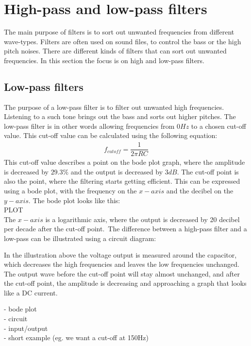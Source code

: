 \chapter{High-pass and low-pass filters}
The main purpose of filters is to sort out unwanted frequencies from different wave-types. Filters are often used on sound files, to control the bass or the high pitch noises. There are different kinds of filters that can sort out unwanted frequencies. In this section the focus is on high and low-pass filters.

\section{Low-pass filters}
The purpose of a low-pass filter is to filter out unwanted high frequencies. Listening to a such tone brings out the bass and sorts out higher pitches. The low-pass filter is in other words allowing frequencies from 0$Hz$ to a chosen cut-off value. This cut-off value can be calculated using the following equation:
\begin{align*}
f_{cutoff}=\dfrac{1}{2 \pi RC}
\end{align*}
This cut-off value describes a point on the bode plot graph, where the amplitude is decreased by $29.3\%$ and the output is decreased by 3$dB$. The cut-off point is also the point, where the filtering starts getting efficient. This can be expressed using a bode plot, with the frequency on the $x-axis$ and the decibel on the $y-axis$. The bode plot looks like this: \\
PLOT \\
The $x-axis$ is a logarithmic axis, where the output is decreased by 20 decibel per decade after the cut-off point.\
The difference between a high-pass filter and a low-pass can be illustrated using a circuit diagram:
\begin{figure}[H]
	
\end{figure}
In the illustration above the voltage output is measured around the capacitor, which decreases the high frequencies and leaves the low frequencies unchanged. The output wave before the cut-off point will stay almost unchanged, and after the cut-off point, the amplitude is decreasing and approaching a graph that looks like a DC current. 


- bode plot \\
- circuit \\
- input/output \\
- short example (eg. we want a cut-off at 150Hz)
